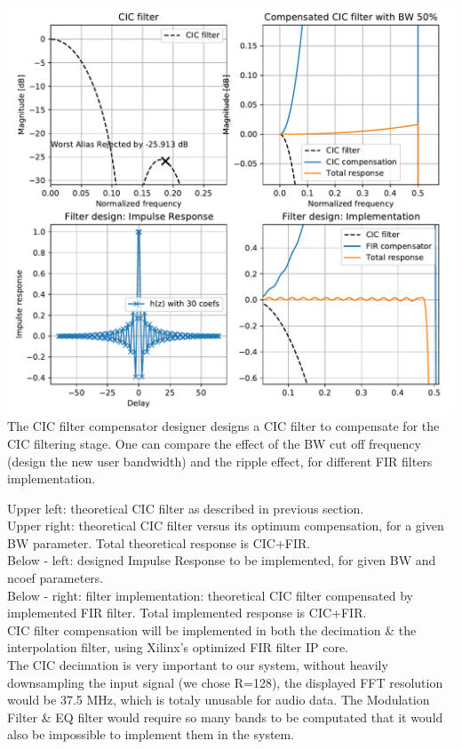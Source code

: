 \documentclass{article}
\begin{document}
\begin{center}
	\includegraphics[width=0.75\linewidth]{fir-des-2.pdf} \\
	The CIC filter compensator designer designs a CIC
	filter to compensate for the CIC filtering stage.
	One can compare the effect of the BW cut off frequency
	(design the new user bandwidth) and the ripple effect,
	for different FIR filters implementation.
\end{center}

Upper left: theoretical CIC filter as described in previous
section. \\

Upper right: theoretical CIC filter versus its optimum
compensation, for a given BW parameter.
Total theoretical response is CIC+FIR. \\

Below - left: designed Impulse Response to be implemented,
for given BW and ncoef parameters. \\

Below - right: filter implementation: theoretical
CIC filter compensated by implemented FIR filter.
Total implemented response is CIC+FIR. \\

CIC filter compensation 
will be implemented in both the decimation
\& the interpolation filter, using
Xilinx's optimized FIR filter IP core. \\

The CIC decimation is very important
to our system, without heavily downsampling
the input signal (we chose R=128),
the displayed FFT resolution would be
37.5 MHz, which is totaly unusable for audio data.
The Modulation Filter \& EQ filter would require so 
many bands to be computated that it would also be impossible
to implement them in the system.
\end{document}
